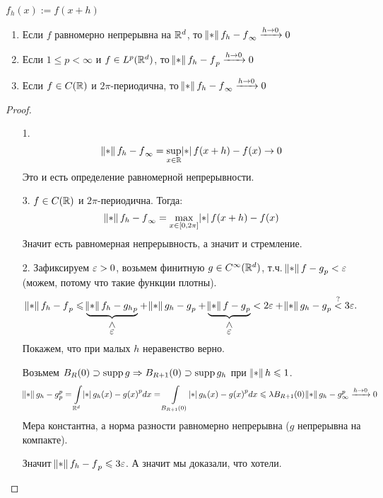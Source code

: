 \begin{theorem}
    $f_h(x) := f(x + h)$
    \begin{enumerate}
        \item Если $f$ равномерно непрерывна на $\mathbb{R}^d$, то $\norm{f_h - f}_\infty \xrightarrow{h \to 0} 0$
        \item Если $1 \leq p < \infty$ и $f \in L^p(\mathbb{R}^d)$, то $\norm{f_{h} - f}_{p} \xrightarrow{h \to 0} 0$
        \item Если $f \in C(\mathbb{R})$ и $2\pi$-периодична, то $\norm{f_h - f}_\infty \xrightarrow{h \to 0} 0$
    \end{enumerate}
\end{theorem}
\begin{proof}$ $
    \begin{enumerate}
        \item[1.] 
        $$\norm{f_h - f}_\infty = \underset{x\in \R}{\sup} \abs{f(x + h) - f(x)} \to 0$$ 
        Это и есть определение равномерной непрерывности.
        \item[3.] $f \in C(\mathbb{R})$ и $2\pi$-периодична.
        Тогда:
        $$\norm{f_h - f}_\infty = \max \limits_{x \in [0, 2\pi]} \abs{f(x + h) - f(x)}$$
        Значит есть равномерная непрерывность, а значит и стремление.
        \item[2.] Зафиксируем $\varepsilon > 0$, возьмем финитную $g \in C^{\infty}(\mathbb{R}^d)$, т.ч. $\norm{f-g}_p < \ve$
              (можем, потому что такие функции плотны).
              \[
                  \norm{f_h - f}_p \leq \lessneqbelow{\underbrace{\norm{f_h - g_h}_p}}{\ve}
                  + \norm{g_h - g}_p
                  + \lessneqbelow{\underbrace{\norm{f - g}_p}}{\ve} <
                  2 \ve + \norm{g_h - g}_p \overset{?}{<} 3 \ve
                  .\]
              Покажем, что при малых $h$ неравенство верно.

              Возьмем $B_R(0) \supset \operatorname{supp} g \Rightarrow B_{R+1}(0) \supset \operatorname{supp} g_h$ при $\norm{h} \leq 1$.
              \[
                  \norm{g_h - g}_p^p = \int\limits_{\R^d} \abs{g_h(x) - g(x)}^p dx
                  = \int\limits_{B_{R+1}(0)} \abs{g_h(x) - g(x)}^p dx
                  \leq \lambda B_{R+1}(0) \norm{g_h - g}_\infty^p \xrightarrow{h \to 0} 0
              \]
              Мера константна, а норма разности равномерно непрерывна ($g$ непрерывна на компакте).
              
              Значит $\norm{f_h - f}_p \leq 3\varepsilon$. А значит мы доказали, что хотели.
    \end{enumerate}
\end{proof}
\newpage

